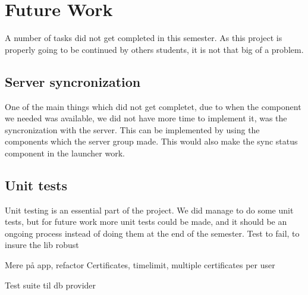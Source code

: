 \section{Future Work}

A number of tasks did not get completed in this semester. As this project is properly going to be continued by others students, it is not that big of a problem. 

\subsection{Server syncronization}
One of the main things which did not get completet, due to when the component we needed was available, we did not have more time to implement it, was the syncronization with the server. This can be implemented by using the components which the server group made. This would also make the sync status component in the launcher work.

\subsection{Unit tests}
Unit testing is an essential part of the project. We did manage to do some unit tests, but for future work more unit tests could be made, and it should be an ongoing process instead of doing them at the end of the semester.
Test to fail, to insure the lib robust

Mere p\aa{} app, refactor
Certificates, timelimit, multiple certificates per user


Test suite til db provider
